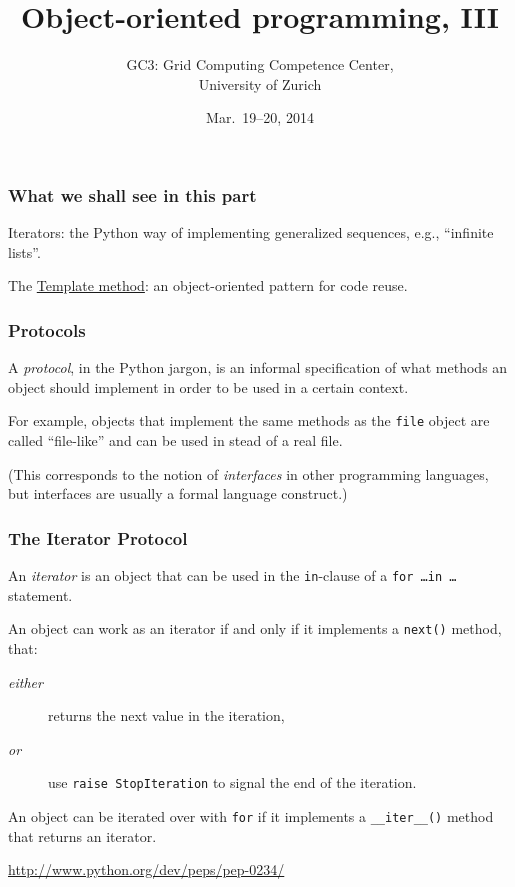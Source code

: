 \documentclass[english,serif,mathserif,xcolor=pdftex,dvipsnames,table]{beamer}
\title[OOP 3]{%
  Object-oriented programming, III
}
\author[GC3]{%
  GC3: Grid Computing Competence Center, \\
  University of Zurich
}
\date{Mar.~19--20, 2014}
\begin{document}
\maketitle


\begin{frame}
  \frametitle{What we shall see in this part}

  Iterators: the Python way of implementing generalized sequences,
  e.g., ``infinite lists''.

  \+
  The \href{http://en.wikipedia.org/wiki/Template_method_pattern}{Template
    method}: an object-oriented pattern for code reuse.
\end{frame}


\begin{frame}
  \frametitle{Protocols}
  A \emph{protocol}, in the Python jargon, is an informal
  specification of what methods an object should implement in order to
  be used in a certain context.

  \+ For example, objects that implement the same methods as the
  \texttt{file} object are called ``file-like'' and can be used in
  stead of a real file.

  \+
  (This corresponds to the notion of \emph{interfaces} in other
  programming languages, but interfaces are usually a formal language
  construct.)
\end{frame}


\begin{frame}[fragile]
  \frametitle{The Iterator Protocol}

  An \emph{iterator} is an object that can be used in the
  \texttt{in}-clause of a \texttt{for \ldots in \ldots} statement.

  \+
  An object can work as an iterator if and only if it implements a
  \texttt{next()} method, that:
  \begin{description}
  \item[\emph{either}] returns the next value in the iteration,
  \item[\emph{or}] use \lstinline|raise StopIteration| to signal the
    end of the iteration.
  \end{description}

  \+
  An object can be iterated over with \lstinline|for| if it implements a
  \lstinline|__iter__()| method that returns an iterator.

  \begin{references}
    \url{http://www.python.org/dev/peps/pep-0234/}
  \end{references}
\end{frame}
\end{document}
